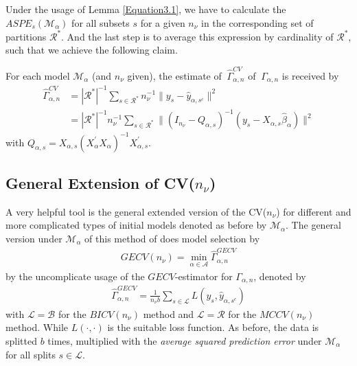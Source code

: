 \documentclass[Research_Module_ES.tex]{subfiles}
\begin{document}
Under the usage of Lemma \ref{Equation3.1}, we have to calculate the $ASPE_{s}(\mathcal{M}_\alpha)$ for all subsets $s$  for a given $n_\nu$ in the corresponding set of partitions $\mathcal{R}^\ast$. And the last step is to average this expression by cardinality of $\mathcal{R}^\ast$, such that we achieve the following claim.

\begin{claim}
	For each model $\mathcal{M}_\alpha$ (and $n_\nu$ given), the estimate of $~\hat{\Gamma}_{\alpha,n}^{CV}$ of $~\Gamma_{\alpha,n}$ is received by
	\begin{align*}
		\hat{\Gamma}_{\alpha,n}^{CV}&=|\mathcal{R}^\ast|^{-1}\sum_{s\in \mathcal{R}^\ast}n_\nu^{-1}\parallel y_s-\hat{y}_{\alpha,s^c}\parallel^2\\
		&=|\mathcal{R}^\ast|^{-1}n_\nu^{-1}\sum_{s\in \mathcal{R}^\ast}\parallel (I_{n_\nu}-Q_{\alpha,s})^{-1}(y_s-X_{\alpha,s}\hat{\beta}_\alpha)\parallel^2
	\end{align*}	
	with $Q_{\alpha,s}=X_{\alpha,s}(X_\alpha^\prime X_\alpha)^{-1}X_{\alpha,s}^\prime$.
\end{claim}


	







\subsection{General Extension of CV($n_\nu$)}
A very helpful tool is the general extended version of the CV($n_\nu$) for different and more complicated types of initial models denoted as before by $\mathcal{M}_\alpha$. The general version under $\mathcal{M}_\alpha$ of this method of \cite{shao} does model selection by 
\begin{align*}
	GECV(n_\nu)=\min_{\alpha\in\mathcal{A}}\hat{\Gamma}_{\alpha,n}^{GECV}
\end{align*}
by the uncomplicate usage of the $GECV$-estimator for $\Gamma_{\alpha,n}$, denoted by
\begin{align*}
	\hat{\Gamma}_{\alpha,n}^{GECV}=\frac{1}{n_\nu b}\sum_{s\in\mathcal{L}}L(y_s,\hat{y}_{\alpha,s^c})
\end{align*} 
with $\mathcal{L}=\mathcal{B}$ for the $BICV(n_\nu)$ method and $\mathcal{L}=\mathcal{R}$ for the $MCCV(n_\nu)$ method. While $L(\cdot,\cdot)$ is the suitable loss function. As before, the data is splitted $b$ times, multiplied with the \textit{average squared prediction error} under $\mathcal{M}_\alpha$ for all splits $s\in\mathcal{L}$.
\end{document}

